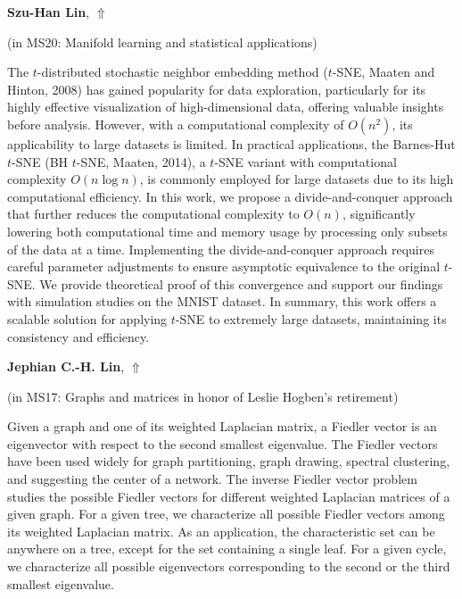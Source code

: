 \documentclass[ILAS2025-program.tex]{subfiles}
\begin{document}
\hypertarget{down0074}{}\begin{ilasabstract}
    
\textbf{Szu-Han Lin},  \hfill \hyperlink{up0074}{$\Uparrow$}
    
    
(in {\color{mstitle}MS20: Manifold learning and statistical applications})
        
\mtskip
    The $t$-distributed stochastic neighbor embedding method  ($t$-SNE, Maaten
and Hinton, 2008) has gained popularity for data exploration, particularly for its highly effective visualization of high-dimensional data, offering valuable insights before analysis. However, with a computational complexity of $O(n^2)$, its applicability to large datasets is limited. In practical applications, the Barnes-Hut $t$-SNE  (BH $t$-SNE, Maaten, 2014), a $t$-SNE variant with computational complexity $O(n\log n)$, is commonly employed for large datasets due to its high computational efficiency. In this work, we propose a divide-and-conquer approach that further reduces the computational complexity to $O(n)$, significantly lowering both computational time and memory usage by processing only subsets of the data at a time. Implementing the divide-and-conquer approach requires careful parameter adjustments to ensure asymptotic equivalence to the original $t$-SNE. We provide theoretical proof of this convergence and support our findings with simulation studies on the MNIST dataset. In summary, this work offers a scalable solution for applying $t$-SNE to extremely large datasets, maintaining its consistency and efficiency.

\end{ilasabstract}
    

\hypertarget{down0221}{}\begin{ilasabstract}
    
\textbf{Jephian C.-H. Lin},  \hfill \hyperlink{up0221}{$\Uparrow$}
    
    
(in {\color{mstitle}MS17: Graphs and matrices in honor of Leslie Hogben's retirement})
        
\mtskip
    Given a graph and one of its weighted Laplacian matrix, a Fiedler vector is an eigenvector with respect to the second smallest eigenvalue. The Fiedler vectors have been used widely for graph partitioning, graph drawing, spectral clustering, and suggesting the center of a network.  The inverse Fiedler vector problem studies the possible Fiedler vectors for different weighted Laplacian matrices of a given graph.  For a given tree, we characterize all possible Fiedler vectors among its weighted Laplacian matrix.  As an application, the characteristic set can be anywhere on a tree, except for the set containing a single leaf.  For a given cycle, we characterize all possible eigenvectors corresponding to the second or the third smallest eigenvalue.

\end{ilasabstract}
    
\end{document}
